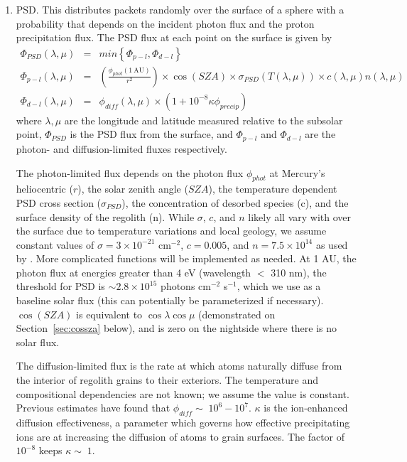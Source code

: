 \documentclass[11pt]{article}
\begin{document}
\begin{enumerate}
\item PSD. This distributes packets randomly over the surface of a sphere with
a probability that depends on the incident photon flux and the proton
precipitation flux. The PSD flux at each point on the surface is given by 
\begin{eqnarray}
\Phi_{PSD}(\lambda,\mu) & = & min \left\{\Phi_{p-l}, \Phi_{d-l} \right\} \\
\Phi_{p-l}(\lambda,\mu) & = & 
  \left(\frac{\phi_{phot}(1~\mathrm{AU})}{r^2}\right) \times 
  \cos(SZA) \times \sigma_{PSD}(T(\lambda,\mu)) \times c(\lambda,\mu) 
  n(\lambda,\mu) \\ 
\Phi_{d-l}(\lambda,\mu) & = & \phi_{diff}(\lambda,\mu) \times \left( 1 + 
  10^{-8} \kappa \phi_{precip}\right)
\end{eqnarray}
where $\lambda,\mu$ are the longitude and latitude measured relative to the
subsolar point, $\Phi_{PSD}$ is the PSD flux from the surface, and 
$\Phi_{p-l}$ and $\Phi_{d-l}$ are the photon- and diffusion-limited fluxes
respectively. 

The photon-limited flux depends on the photon flux $\phi_{phot}$ at Mercury's 
heliocentric ($r$), the solar zenith angle ($SZA$), the temperature dependent
PSD cross section ($\sigma_{PSD}$), the concentration of desorbed species (c), 
and the surface density of the regolith (n). While $\sigma$, $c$, and $n$
likely all vary with over the surface due to temperature variations and local
geology, we assume constant values of $\sigma=3\times10^{-21}$ cm$^{-2}$,
$c=0.005$, and $n=7.5\times10^{14}$ as used by \cite{burger2010}. More
complicated functions will be implemented as needed. At 1 AU, the photon flux
at energies greater than 4 eV (wavelength $<$ 310 nm), the threshold for PSD is
$\sim2.8\times10^{15}$ photons cm$^{-2}$ s$^{-1}$, which we use as a baseline
solar flux (this can potentially be parameterized if necessary).
$\cos(SZA)$ is equivalent to $\cos \lambda \cos \mu$ (demonstrated on 
Section~\ref{sec:cossza} below), and is zero on the nightside where there is no 
solar flux. 

The diffusion-limited flux is the rate at which atoms naturally diffuse from
the interior of regolith grains to their exteriors. The temperature and
compositional dependencies are not known; we assume the value is constant.
Previous estimates \cite{burger2010,killen2005} have found that $\phi_{diff}
\sim\; 10^6 - 10^7$. $\kappa$ is the ion-enhanced diffusion effectiveness, a
parameter which governs how effective precipitating ions are at increasing the
diffusion of atoms to grain surfaces. The factor of $10^{-8}$ keeps $\kappa
\sim\; 1$. 


\end{enumerate}
\end{document}
